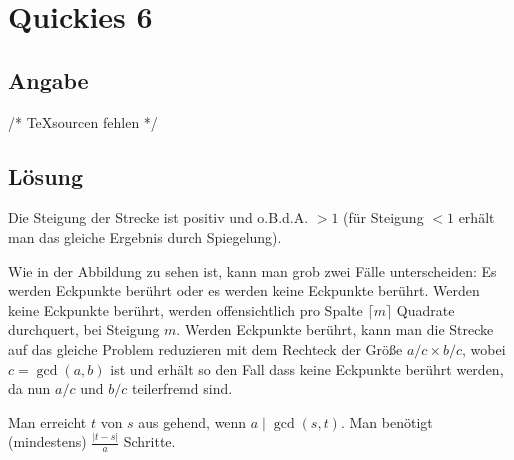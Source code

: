 \section*{Quickies 6}

\subsection*{Angabe}
%
/* \TeX sourcen fehlen */

\subsection*{Lösung}
\begin{flushenum}
\item
\begin{flushalpha}
	\item Die Steigung der Strecke ist positiv und o.B.d.A. $> 1$ (für Steigung $<1$ erhält man das gleiche Ergebnis durch Spiegelung).
	\begin{figure}[h!]
		\begin{center}
		\end{center}
	\end{figure}
	Wie in der Abbildung zu sehen ist, kann man grob zwei Fälle unterscheiden: Es werden Eckpunkte berührt oder es werden keine Eckpunkte berührt.
	Werden keine Eckpunkte berührt, werden offensichtlich pro Spalte $\lceil m \rceil$ Quadrate durchquert, bei Steigung $m$.
	Werden Eckpunkte berührt, kann man die Strecke auf das gleiche Problem reduzieren mit dem Rechteck der Größe $a/c \times b/c$,
	wobei $c = \gcd(a,b)$ ist und erhält so den Fall dass keine Eckpunkte berührt werden, da nun $a/c$ und $b/c$ teilerfremd sind.

	\item Man erreicht $t$ von $s$ aus gehend, wenn $a \mid \gcd(s,t)$. Man benötigt (mindestens) $\frac{|t-s|}{a}$ Schritte.


\end{flushalpha}
\end{flushenum}
